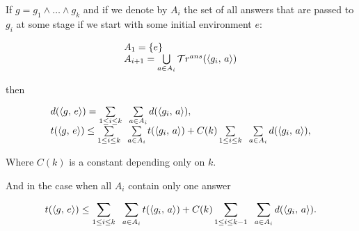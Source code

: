 \begin{lemma}

If $g = g_1 \land \dots \land g_k$ and if we denote by $A_i$ the set of all answers that are passed to $g_i$ at some stage if we start with some initial environment $e$:

\[ \begin{array}{l}
A_1 = \{ e \} \\
A_{i + 1} = \bigcup\limits_{a \in A_i} \mathcal{T}r^{ans}(\langle g_i ,\, a \rangle) \\
\end{array} \]

then

\[ \begin{array}{l}
d(\langle g ,\, e \rangle) = \sum\limits_{1 \le i \le k} \;\; \sum\limits_{a \in A_i} d(\langle g_i ,\, a \rangle), \\
t(\langle g ,\, e \rangle) \le \sum\limits_{1 \le i \le k} \;\; \sum\limits_{a \in A_i} t(\langle g_i ,\, a \rangle) + C(k) \sum\limits_{1 \le i \le k} \;\; \sum\limits_{a \in A_i} d(\langle g_i ,\, a \rangle), \\
\end{array} \]

Where $C(k)$ is a constant depending only on $k$.

And in the case when all $A_i$ contain only one answer

\[ t(\langle g ,\, e \rangle) \le \sum\limits_{1 \le i \le k} \;\; \sum\limits_{a \in A_i} t(\langle g_i ,\, a \rangle) + C(k) \sum\limits_{1 \le i \le k - 1} \;\; \sum\limits_{a \in A_i} d(\langle g_i ,\, a \rangle). \]

\end{lemma}
